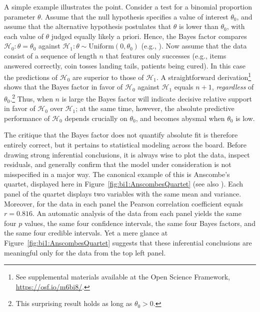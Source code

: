 A simple example illustrates the point. Consider a test for a binomial proportion parameter $\theta$. Assume that the null hypothesis specifies a value of interest $\theta_0$, and assume that the alternative hypothesis postulates that $\theta$ is lower than $\theta_0$, with each value of $\theta$ judged equally likely a priori. Hence, the Bayes factor compares $\mathcal{H}_0: \theta = \theta_0$ against $\mathcal{H}_1: \theta \sim \text{Uniform}(0,\theta_0)$ (e.g., ). Now assume that the data consist of a sequence of length $n$ that features only successes (e.g., items answered correctly, coin tosses landing tails, patients being cured). In this case the predictions of $\mathcal{H}_0$ are superior to those of $\mathcal{H}_1$. A straightforward derivation\footnote{See supplemental materials available at the Open Science Framework, \url{https://osf.io/m6bi8/}.} shows that the Bayes factor in favor of $\mathcal{H}_0$ against $\mathcal{H}_1$ equals $n+1$, \emph{regardless} of $\theta_0$.\footnote{This surprising result holds as long as $\theta_0 > 0$.} Thus, when $n$ is large the Bayes factor will indicate decisive relative support in favor of $\mathcal{H}_0$ over $\mathcal{H}_1$; at the same time, however, the absolute predictive performance of $\mathcal{H}_0$ depends crucially on $\theta_0$, and becomes abysmal when $\theta_0$ is low.

The critique that the Bayes factor does not quantify absolute fit is therefore entirely correct, but it pertains to statistical modeling across the board. Before drawing strong inferential conclusions, it is always wise to plot the data, inspect residuals, and generally confirm that the model under consideration is not misspecified in a major way. The canonical example of this is Anscombe's quartet, displayed here in Figure~\ref{fig:bi1:AnscombesQuartet} (see also ). Each panel of the quartet displays two variables with the same mean and variance. Moreover, for the data in each panel the Pearson correlation coefficient equals $r = 0.816$. An automatic analysis of the data from each panel yields the same four $p$ values, the same four confidence intervals, the same four Bayes factors, and the same four credible intervals. Yet a mere glance at Figure~\ref{fig:bi1:AnscombesQuartet} suggests that these inferential conclusions are meaningful only for the data from the top left panel.

